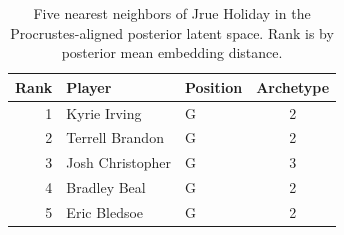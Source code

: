\begin{table}[htbp]
  \centering\small
  \begin{tabular}{rllc}
    \toprule
    Rank & Player & Position & Archetype \\
    \midrule
    1 & Kyrie Irving & G & 2 \\
    2 & Terrell Brandon & G & 2 \\
    3 & Josh Christopher & G & 3 \\
    4 & Bradley Beal & G & 2 \\
    5 & Eric Bledsoe & G & 2 \\
    \bottomrule
  \end{tabular}
  \caption{Five nearest neighbors of Jrue Holiday in the Procrustes-aligned posterior latent space. Rank is by posterior mean embedding distance.}
  \label{tab:Jrue_Holiday_neighbors}
\end{table}

